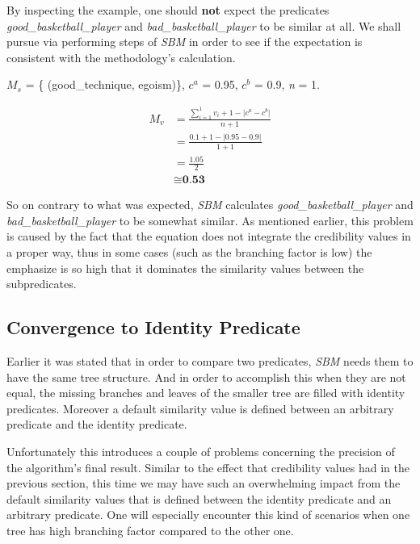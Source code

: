 By inspecting the example, one should \textbf{not} expect the predicates \textit{good\_basketball\_player} and \textit{bad\_basketball\_player} to be similar at all. We shall pursue via performing steps of \textit{SBM} in order to see if the expectation is consistent with the methodology's calculation.

$M_{s}$ = \{ (good\_technique, egoism)\}, $c^a$ = 0.95, $c^b$ = 0.9,   \textit{n} = 1.     

\begin{equation}\label{eq:sbmE1}
\begin{split}
M_v &=\frac{\sum_{i=1}^{1} v_i+1-\lvert c^a-c^b\rvert}{n+1}\\
&=\frac{0.1 +1-\lvert 0.95 - 0.9\rvert}{1+1}\\
&= \frac{1.05}{2}\\
&\cong{\textbf{0.53}}
 \end{split} 
\end{equation}

So on contrary to what was expected, \textit{SBM} calculates \textit{good\_basketball\_player} and \linebreak \textit{bad\_basketball\_player} to be somewhat similar. As mentioned earlier, this problem is caused by the fact that the equation does not integrate the credibility values in a proper way, thus in some cases (such as the branching factor is low) the emphasize is so high that it dominates the similarity values between the subpredicates. 

\subsection{Convergence to Identity Predicate}
\label{conv}
Earlier it was stated that in order to compare two predicates, \textit{SBM} needs them to have the same tree structure. And in order to accomplish this when they are not equal, the missing branches and leaves of the smaller tree are filled with identity predicates. Moreover a default similarity value is defined between an arbitrary predicate and the identity predicate. 

Unfortunately this introduces a couple of problems concerning the precision of the algorithm's final result. Similar to the effect that credibility values had in the previous section, this time we may have such an overwhelming impact from the default similarity values that is defined between the identity predicate and an arbitrary predicate.  One will especially encounter this kind of scenarios when one tree has high branching factor compared to the other one.


